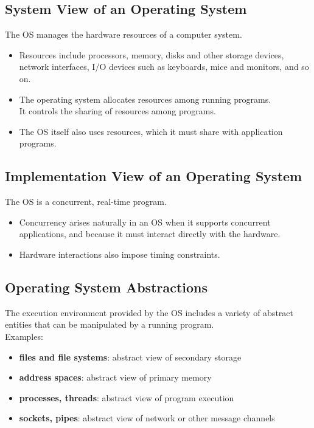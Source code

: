 \documentclass[12pt]{article}
\theoremstyle{plain}
\theoremstyle{definition}
\begin{document}
\subsection{System View of an Operating System}\label{sys_view_OS}
The OS manages the hardware resources of a computer system.
\begin{itemize}
  \item Resources include processors, memory, disks and other storage devices, network interfaces, I/O devices such as keyboards, mice and monitors, and so on.
  \item The operating system allocates resources among running programs. \\
  It controls the sharing of resources among programs.
  \item The OS itself also uses resources, which it must share with application programs.
\end{itemize}

\subsection{Implementation View of an Operating System}\label{impl_view_OS}
The OS is a concurrent, real-time program.
\begin{itemize}
  \item Concurrency arises naturally in an OS when it supports concurrent applications, and because it must interact directly with the hardware.
  \item Hardware interactions also impose timing constraints.
\end{itemize}

\subsection{Operating System Abstractions}
The execution environment provided by the OS includes a variety of abstract entities that can be manipulated by a running program. \\
Examples:
\begin{itemize}
  \item \textbf{files and file systems}: abstract view of secondary storage
  \item \textbf{address spaces}: abstract view of primary memory
  \item \textbf{processes, threads}: abstract view of program execution
  \item \textbf{sockets, pipes}: abstract view of network or other message channels
\end{itemize}
\end{document}
